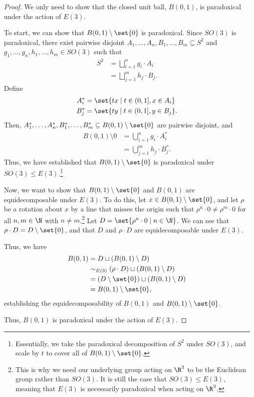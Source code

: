 \documentclass[12pt]{mypackage}
\begin{document}
\begin{proof}
  We only need to show that the closed unit ball, $B(0,1)$, is paradoxical under the action of $E(3)$.\newline

  To start, we can show that $B(0,1)\setminus \set{0}$ is paradoxical. Since $SO(3)$ is paradoxical, there exist pairwise disjoint $A_1,\dots,A_n,B_1,\dots,B_m\subseteq S^2$ and $g_1,\dots,g_n,h_1,\dots,h_m\in SO(3)$ such that
  \begin{align*}
    S^2 &= \bigsqcup_{i=1}^{n}g_i\cdot A_i\\
        &= \bigsqcup_{j=1}^{m}h_j\cdot B_j.
  \end{align*}
  Define
  \begin{align*}
    A_i^{\ast} &= \set{tx\mid t\in (0,1],x\in A_i}\\
    B_j^{\ast} &= \set{ty\mid t\in (0,1],y\in B_j}.
  \end{align*}
  Then, $A_1^{\ast},\dots,A_n^{\ast},B_1^{\ast},\dots,B_m^{\ast}\subseteq B(0,1)\setminus \set{0}$ are pairwise disjoint, and
  \begin{align*}
    B(0,1)\setminus {0} &= \bigcup_{i=1}^{n}g_i\cdot A_i^{\ast}\\
           &= \bigcup_{j=1}^{m}h_j\cdot B_j^{\ast}.
  \end{align*}
  Thus, we have established that $B(0,1)\setminus \set{0}$ is paradoxical under $SO(3)\leq E(3)$.\footnote{Essentially, we take the paradoxical decomposition of $S^2$ under $SO(3)$, and scale by $t$ to cover all of $B(0,1)\setminus \set{0}$.}\newline

  Now, we want to show that $B(0,1)\setminus \set{0}$ and $B(0,1)$ are equidecomposable under $E(3)$. To do this, let $x \in B(0,1)\setminus \set{0}$, and let $\rho$ be a rotation about $x$ by a line that misses the origin such that $\rho^{n}\cdot 0 \neq \rho^{m}\cdot 0$ for all $n,m\in \N$ with $n\neq m$.\footnote{This is why we need our underlying group acting on $\R^3$ to be the Euclidean group rather than $SO(3)$. It is still the case that $SO(3)\leq E(3)$, meaning that $E(3)$ is necessarily paradoxical when acting on $\R^3$.} Let $D = \set{\rho^{n}\cdot 0\mid n\in\N}$. We can see that $\rho\cdot D = D\setminus \set{0}$, and that $D$ and $\rho\cdot D$ are equidecomposable under $E(3)$.\newline

  Thus, we have
  \begin{align*}
    B(0,1) &= D\sqcup \left(B(0,1)\setminus D\right)\\
           &\sim_{E(3)} \left(\rho\cdot D\right)\sqcup \left(B(0,1)\setminus D\right)\\
           &= \left(D\setminus \set{0}\right) \sqcup \left(B(0,1)\setminus D\right)\\
           &= B(0,1)\setminus \set{0},
  \end{align*}
  establishing the equidecomposability of $B(0,1)$ and $B(0,1)\setminus \set{0}$.\newline

  Thus, $B(0,1)$ is paradoxical under the action of $E(3)$.
\end{proof}
\end{document}
